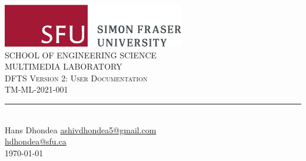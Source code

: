 \begin{titlepage}
	\centering
	\includegraphics[scale = 0.75]{Figures/SFUhorizontallogorgb.pdf}\\[1.0 cm]
	\textsc{SCHOOL OF ENGINEERING SCIENCE}\\[0.2 cm]
	\textsc{MULTIMEDIA LABORATORY}\\[2.2 cm]
	\textsc{\Large DFTS Version 2: User Documentation}\\[0.5 cm]
	\textsc{\normalsize TM-ML-2021-001 }\\[0.2 cm]
	\rule{\linewidth}{0.2 mm} \\[0.4 cm]
	
	
	\vspace*{2cm}
	Hans Dhondea\linebreak
	\href{mailto:ashivdhondea5@gmail.com}{ashivdhondea5@gmail.com} 
	\\
	\href{mailto:hdhondea@sfu.ca}{hdhondea@sfu.ca}
	\\
	\vspace{5cm}
	\today
	
	\vfill
	
\end{titlepage}